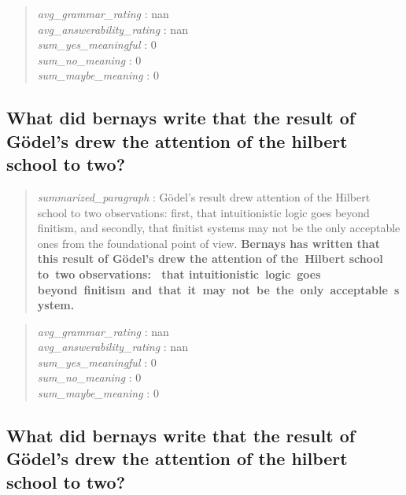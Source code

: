 \begin{quote}
\emph{avg\_grammar\_rating} : nan\\
\emph{avg\_answerability\_rating} : nan\\
\emph{sum\_yes\_meaningful} : 0\\
\emph{sum\_no\_meaning} : 0\\
\emph{sum\_maybe\_meaning} : 0
\end{quote}

\hypertarget{what-did-bernays-write-that-the-result-of-guxf6dels-drew-the-attention-of-the-hilbert-school-to-two}{%
\subsection{What did bernays write that the result of Gödel's drew the
attention of the hilbert school to
two?}\label{what-did-bernays-write-that-the-result-of-guxf6dels-drew-the-attention-of-the-hilbert-school-to-two}}

\begin{quote}
\emph{summarized\_paragraph} : Gödel's result drew attention of the
Hilbert school to two observations: first, that intuitionistic logic
goes beyond finitism, and secondly, that finitist systems may not be the
only acceptable ones from the foundational point of view.
\textbf{Bernays has written that this result of Gödel's drew the
attention of the~Hilbert school to~two observations: ~that
intuitionistic~logic~goes
beyond~finitism~and~that~it~may~not~be~the~only~acceptable~system.}
\end{quote}

\begin{quote}
\emph{avg\_grammar\_rating} : nan\\
\emph{avg\_answerability\_rating} : nan\\
\emph{sum\_yes\_meaningful} : 0\\
\emph{sum\_no\_meaning} : 0\\
\emph{sum\_maybe\_meaning} : 0
\end{quote}

\hypertarget{what-did-bernays-write-that-the-result-of-guxf6dels-drew-the-attention-of-the-hilbert-school-to-two-1}{%
\subsection{What did bernays write that the result of Gödel's drew the
attention of the hilbert school to
two?}\label{what-did-bernays-write-that-the-result-of-guxf6dels-drew-the-attention-of-the-hilbert-school-to-two-1}}

